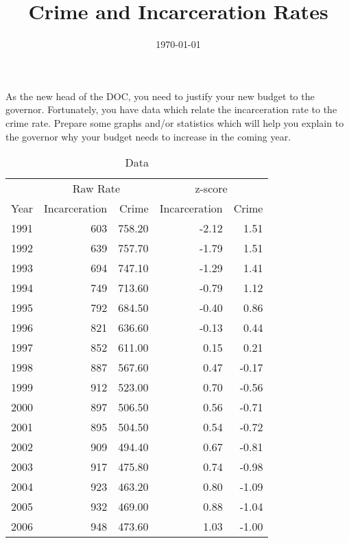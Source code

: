 \documentclass{article}
\author{}
\title{Crime and Incarceration Rates}
\date{\today}
\begin{document}
  \maketitle

  As the new head of the DOC, you need to justify your new budget to the
  governor.  Fortunately, you have data which relate the incarceration rate to
  the crime rate.  Prepare some graphs and/or statistics which will help you
  explain to the governor why your budget needs to increase in the coming year.

  \begin{table}[H]
    \centering
    \begin{tabular}{rrrrr}
      \toprule
      & \multicolumn{2}{c}{Raw Rate} & \multicolumn{2}{c}{z-score } \\
      \cmidrule(r){2-3} \cmidrule(r){4-5} 
      Year & Incarceration & Crime  & Incarceration & Crime  \\
      \midrule
      1991 & 603           & 758.20 & -2.12         & 1.51   \\
      1992 & 639           & 757.70 & -1.79         & 1.51   \\
      1993 & 694           & 747.10 & -1.29         & 1.41   \\
      1994 & 749           & 713.60 & -0.79         & 1.12   \\
      1995 & 792           & 684.50 & -0.40         & 0.86   \\
      1996 & 821           & 636.60 & -0.13         & 0.44   \\
      1997 & 852           & 611.00 & 0.15          & 0.21   \\
      1998 & 887           & 567.60 & 0.47          & -0.17  \\
      1999 & 912           & 523.00 & 0.70          & -0.56  \\
      2000 & 897           & 506.50 & 0.56          & -0.71  \\
      2001 & 895           & 504.50 & 0.54          & -0.72  \\
      2002 & 909           & 494.40 & 0.67          & -0.81  \\
      2003 & 917           & 475.80 & 0.74          & -0.98  \\
      2004 & 923           & 463.20 & 0.80          & -1.09  \\
      2005 & 932           & 469.00 & 0.88          & -1.04  \\
      2006 & 948           & 473.60 & 1.03          & -1.00  \\
      \bottomrule
    \end{tabular}
    \caption{Data}
  \end{table}
\end{document}
